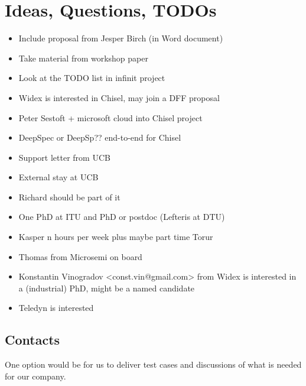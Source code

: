 \documentclass[fleqn,12pt]{article}
\begin{document}

\newpage
\small

%


\newpage

\section{Ideas, Questions, TODOs}



\begin{itemize}
\item Include proposal from Jesper Birch (in Word document)
\item Take material from workshop paper
\item Look at the TODO list in infinit project
\item Widex is interested in Chisel, may join a DFF proposal
\item Peter Sestoft + microsoft cloud into Chisel project
\item DeepSpec or DeepSp?? end-to-end for Chisel
\item Support letter from UCB
\item External stay at UCB
\item Richard should be part of it
\item One PhD at ITU and PhD or postdoc (Lefteris at DTU)
\item Kasper n hours per week plus maybe part time Torur
\item Thomas from Microsemi on board
\item Konstantin Vinogradov <const.vin@gmail.com> from Widex is interested in a (industrial) PhD, might be a named candidate
\item Teledyn is interested
\end{itemize}

\subsection{Contacts}

%
%
%
%


One option would be for us to deliver test cases and discussions of what is needed for our company. 
\end{document}
